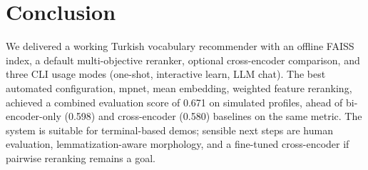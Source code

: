 \documentclass{article}
\begin{document}
\section{Conclusion}

We delivered a working Turkish vocabulary recommender with an offline FAISS index, a default multi-objective reranker, optional cross-encoder comparison, and three CLI usage modes (one-shot, interactive learn, LLM chat). The best automated configuration, mpnet, mean embedding, weighted feature reranking, achieved a combined evaluation score of 0.671 on simulated profiles, ahead of bi-encoder-only (0.598) and cross-encoder (0.580) baselines on the same metric. The system is suitable for terminal-based demos; sensible next steps are human evaluation, lemmatization-aware morphology, and a fine-tuned cross-encoder if pairwise reranking remains a goal.

\clearpage


\end{document}
